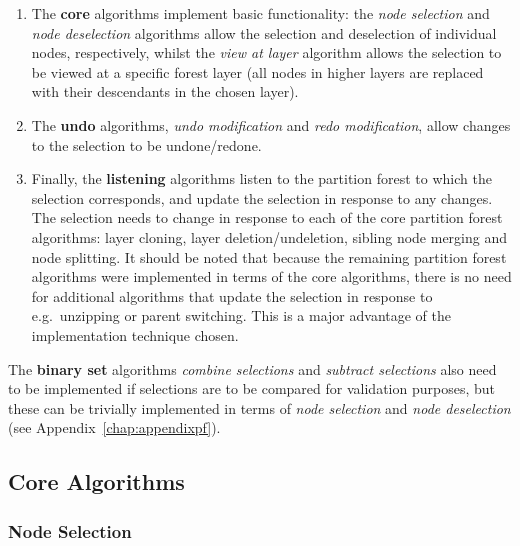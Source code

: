 \begin{enumerate}

\item The \textbf{core} algorithms implement basic functionality: the \emph{node selection} and \emph{node deselection} algorithms allow the selection and deselection of individual nodes, respectively, whilst the \emph{view at layer} algorithm allows the selection to be viewed at a specific forest layer (all nodes in higher layers are replaced with their descendants in the chosen layer).

\item The \textbf{undo} algorithms, \emph{undo modification} and \emph{redo modification}, allow changes to the selection to be undone/redone.

\item Finally, the \textbf{listening} algorithms listen to the partition forest to which the selection corresponds, and update the selection in response to any changes. The selection needs to change in response to each of the core partition forest algorithms: layer cloning, layer deletion/undeletion, sibling node merging and node splitting. It should be noted that because the remaining partition forest algorithms were implemented in terms of the core algorithms, there is no need for additional algorithms that update the selection in response to e.g.~unzipping or parent switching. This is a major advantage of the implementation technique chosen.

\end{enumerate}

\noindent The \textbf{binary set} algorithms \emph{combine selections} and \emph{subtract selections} also need to be implemented if selections are to be compared for validation purposes, but these can be trivially implemented in terms of \emph{node selection} and \emph{node deselection} (see Appendix~\ref{chap:appendixpf}).

\afterpage{\clearpage}

\subsection{Core Algorithms}

\subsubsection{Node Selection}

